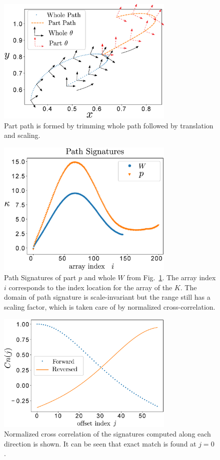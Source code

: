 \documentclass[twocolumn,10pt]{asme2ej}
\begin{document}
\begin{figure}
\centering
\includegraphics[width=240pt]{figure/fig_whole_part.eps}
  \caption{Part path is formed by trimming whole path followed by translation and scaling.}
\label{wholePart}
\end{figure}

\begin{figure}
\centering
\includegraphics[width=240pt]{figure/fig_path_signatures.eps}
  \caption{Path Signatures of part $p$ and whole $W$ from Fig.~\ref{wholePart}. The array index $i$ corresponds to the index location for the array of the $K$. The domain of path signature is scale-invariant but the range still has a scaling factor, which is taken care of by normalized cross-correlation.}
\label{pathSignature}
\end{figure}

\begin{figure}
\centering
\includegraphics[width=240pt]{figure/fig_ncc.eps}
  \caption{Normalized cross correlation of the signatures computed along each direction is shown. It can be seen that exact match is found at $j=0$.}
\label{ncc}
\end{figure}
\end{document}
